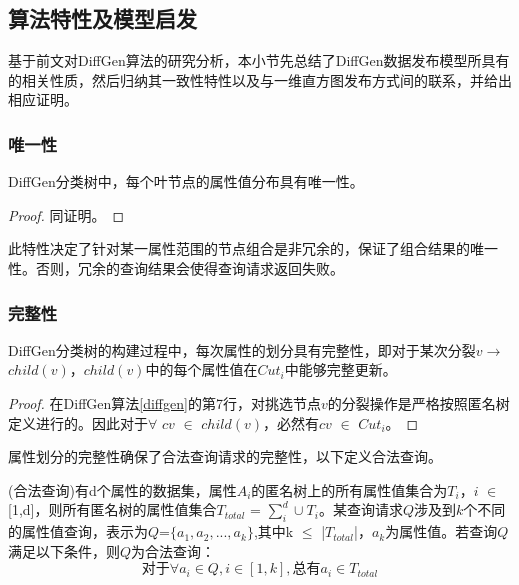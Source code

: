 \subsection{算法特性及模型启发}

基于前文对DiffGen算法的研究分析，本小节先总结了DiffGen数据发布模型所具有的相关性质，然后归纳其一致性特性以及与一维直方图发布方式间的联系，并给出相应证明。
\subsubsection{唯一性}
\begin{prop}
	\label{chap4_prop1}
	DiffGen分类树中，每个叶节点的属性值分布具有唯一性。
\end{prop}
\begin{proof}
	同\label{prop1}证明。
\end{proof}
此特性决定了针对某一属性范围的节点组合是非冗余的，保证了组合结果的唯一性。否则，冗余的查询结果会使得查询请求返回失败。

\subsubsection{完整性}

\begin{prop}
	\label{chap4_prop2}
	DiffGen分类树的构建过程中，每次属性的划分具有完整性，即对于某次分裂$v$$\rightarrow$$child(v)$，$child(v)$中的每个属性值在$Cut_{i}$中能够完整更新。
\end{prop}
\begin{proof}
	在DiffGen算法\ref{diffgen}的第7行，对挑选节点$v$的分裂操作是严格按照匿名树定义进行的。因此对于$\forall$ $cv$ $\in$ $child(v)$，必然有$cv$ $\in$ $Cut_{i}$。
\end{proof}

属性划分的完整性确保了合法查询请求的完整性，以下定义合法查询。

\begin{defn}
	(合法查询)有d个属性的数据集，属性$A_{i}$的匿名树上的所有属性值集合为$T_{i}$，$i$ $\in$ [1,d]，则所有匿名树的属性值集合$T_{total}$ = $\sum\limits_i^d \cup T_{i}$。某查询请求$Q$涉及到$k$个不同的属性值查询，表示为$Q$=$\{a_{1},a_{2},...,a_{k}\}$,其中k $\leqslant$ |$T_{total}$|，$a_{k}$为属性值。若查询$Q$满足以下条件，则$Q$为合法查询：
	\begin{equation}
	\text{对于}\forall a_{i} \in Q, i \in [1,k], \text{总有}a_{i} \in T_{total}
	\end{equation}
	
\end{defn}


